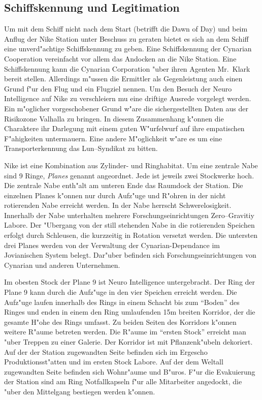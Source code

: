 \subsection{Schiffskennung und Legitimation}
Um mit dem Schiff nicht nach dem Start (betrifft die Dawn of Day) und beim Anflug der Nike Station unter Beschuss 
zu geraten bietet es sich an dem Schiff eine unverd"achtige Schiffskennung zu geben. Eine Schiffskennung der Cynarian Cooperation vereinfacht vor allem das Andocken an die Nike Station. Eine Schiffskennung kann die Cynarian Corporation "uber ihren Agenten
Mr.~Klark bereit stellen. Allerdings m"ussen die Ermittler als Gegenleistung auch einen Grund f"ur den Flug und ein Flugziel nennen. Um den Besuch der Neuro Intelligence auf Nike zu verschleiern mu\3 eine driftige Ausrede vorgelegt werden. Ein m"oglicher vorgeschobener Grund w"are die sichergestellten Daten aus der Risikozone Valhalla zu bringen. In diesem Zusammenhang k"onnen die Charaktere ihr Darlegung mit einem guten W"urfelwurf auf ihre empatischen F"ahigkeiten untermauern. Eine andere M"oglichkeit w"are es um eine Transporterkennung das Lun--Syndikat zu bitten.



Nike ist eine Kombination aus Zylinder- und Ringhabitat. Um eine zentrale Nabe sind 9 Ringe, \emph{Planes} genannt angeordnet. Jede ist jeweils zwei Stockwerke hoch. Die zentrale Nabe enth"alt am unteren Ende das Raumdock der Station.  Die einzelnen Planes k"onnen nur durch Aufz"uge und R"ohren in der nicht rotierenden Nabe erreicht werden. In der Nabe herrscht Schwerelosigkeit. Innerhalb der Nabe unterhalten mehrere Forschungseinrichtungen Zero--Gravitiy Labore. Der "Ubergang von der still stehenden Nabe in die rotierenden Speichen erfolgt durch Schleusen, die kurzzeitig in Rotation versetzt werden. Die untersten drei Planes werden von der Verwaltung der Cynarian-Dependance im Jovianischen System belegt. Dar"uber befinden sich Forschungseinrichtungen von Cynarian und anderen Unternehmen.

Im obesten Stock der Plane 9 ist Neuro Intelligence untergebracht. Der Ring der Plane 9 kann durch die Aufz"uge in den vier Speichen erreicht werden. Die Aufz"uge laufen innerhalb des Rings in einem Schacht bis zum "`Boden"' des Ringes und enden in einem den Ring umlaufenden 15m breiten Korridor, der die gesamte H"ohe des Rings umfasst. Zu beiden Seiten des Korridors k"onnen weitere R"aume betreten werden. Die R"aume im "`ersten Stock"' erreicht man "uber Treppen zu einer Galerie. Der Korridor ist mit Pflanzenk"ubeln dekoriert. Auf der der Station zugewandten Seite befinden sich im Ergescho\3 Produktionsst"atten und im ersten Stock Labore. Auf der dem Weltall zugewandten Seite befinden sich Wohnr"aume und B"uros. F"ur die Evakuierung der Station sind am Ring Notfallkapseln f"ur alle Mitarbeiter angedockt, die "uber den Mittelgang bestiegen werden k"onnen.

